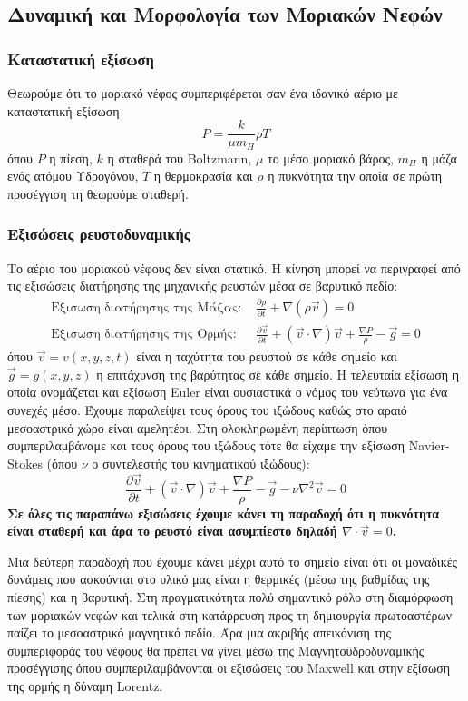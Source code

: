 \documentclass[a4paper,12pt]{memoir}
\newcommand{\pt}[1]{\frac{\partial #1}{\partial t}}
\newcommand{\vv}{\vec{v}}
\begin{document}
\subsection{Δυναμική και Μορφολογία των Μοριακών Νεφών}
\subsubsection{Καταστατική εξίσωση}
Θεωρούμε ότι το μοριακό νέφος συμπεριφέρεται σαν ένα ιδανικό αέριο με καταστατική εξίσωση
\begin{equation}
P=\frac{k}{\mu m_{H}} \rho T
\end{equation}
όπου $P$ η πίεση, $k$ η σταθερά του Boltzmann, $\mu$ το μέσο μοριακό βάρος, $m_{H}$ η μάζα ενός ατόμου Υδρογόνου, $T$ η θερμοκρασία και $\rho$ η πυκνότητα την οποία σε πρώτη προσέγγιση τη θεωρούμε σταθερή.
\subsubsection{Εξισώσεις ρευστοδυναμικής}
Το αέριο του μοριακού νέφους δεν είναι στατικό. Η κίνηση μπορεί να περιγραφεί από τις εξισώσεις διατήρησης της μηχανικής ρευστών μέσα σε βαρυτικό πεδίο:
\begin{align}
\text{Εξισωση διατήρησης της Μάζας:  } &\pt{\rho} + \nabla (\rho \vv)=0 \\
\text{Εξισωση διατήρησης της Ορμής:  } &\pt{\vv} +(\vv \cdot \nabla) \vv +\frac{\nabla P}{\rho} -\vec{g}=0
\label{eq:euler}
\end{align}
όπου $\vv=v(x,y,z,t)$ είναι η ταχύτητα του ρευστού σε κάθε σημείο και $\vec{g}=g(x,y,z)$ η επιτάχυνση της βαρύτητας σε κάθε σημείο.
Η τελευταία εξίσωση η οποία ονομάζεται και εξίσωση Euler είναι ουσιαστικά ο νόμος του νεύτωνα για ένα συνεχές μέσο.
Έχουμε παραλείψει τους όρους του ιξώδους καθώς στο αραιό μεσοαστρικό χώρο είναι αμελητέοι. Στη ολοκληρωμένη περίπτωση όπου συμπεριλαμβάναμε και τους όρους του ιξώδους τότε θα είχαμε την εξίσωση Navier-Stokes (όπου $\nu$ ο συντελεστής του κινηματικού ιξώδους): 
$$
\pt{\vv} +(\vv \cdot \nabla) \vv +\frac{\nabla P}{\rho} -\vec{g}-\nu \nabla ^2 \vv=0
$$
\textbf{Σε όλες τις παραπάνω εξισώσεις έχουμε κάνει τη παραδοχή ότι η πυκνότητα είναι σταθερή και άρα το ρευστό είναι ασυμπίεστο δηλαδή $\nabla \cdot \vv = 0$.}

Μια δεύτερη παραδοχή που έχουμε κάνει μέχρι αυτό το σημείο είναι ότι οι μοναδικές δυνάμεις που ασκούνται στο υλικό μας είναι η θερμικές (μέσω της βαθμίδας της πίεσης) και η βαρυτική. Στη πραγματικότητα πολύ σημαντικό ρόλο στη διαμόρφωση των μοριακών νεφών και τελικά στη κατάρρευση προς τη δημιουργία πρωτοαστέρων παίζει το μεσοαστρικό μαγνητικό πεδίο. Άρα μια ακριβής απεικόνιση της συμπεριφοράς του νέφους θα πρέπει να γίνει μέσω της Μαγνητοϋδροδυναμικής προσέγγισης όπου συμπεριλαμβάνονται οι εξισώσεις του Maxwell και στην εξίσωση της ορμής η δύναμη Lorentz.    
\end{document}
